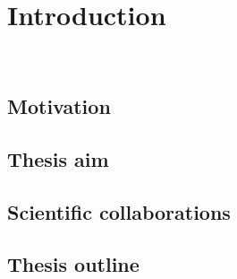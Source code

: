 
\chapter{Introduction}
\label{cap:introduction}
\thispagestyle{empty}

\newpage
\thispagestyle{empty}
\ %
\newpage

\section{Motivation}


\section{Thesis aim}


\section{Scientific collaborations}


\section{Thesis outline}
 

\newpage
\thispagestyle{empty}
\ %
\newpage